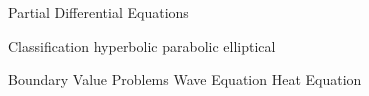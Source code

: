 Partial Differential Equations

Classification 
hyperbolic
parabolic
elliptical
\begin{frame}
Boundary Value Problems
Wave Equation
Heat Equation


\end{frame}

